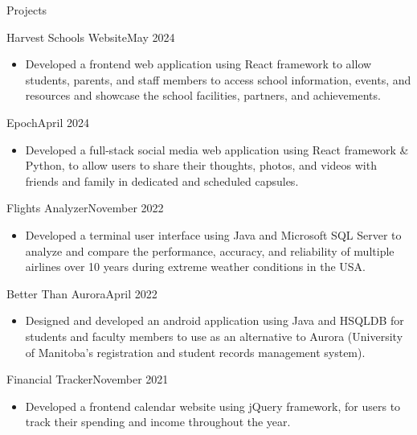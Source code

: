 \documentclass{article}
\newlength{\tabin}
\newlength{\secsep}
\newcommand{\lineunder}{\vspace*{-8pt} \\ \hspace*{-6pt} \hrulefill \\ \vspace*{-15pt}}
\newenvironment{tabbedsection}[1]{
    \begin{list}{}{
        \setlength{\itemsep}{0pt}
        \setlength{\labelsep}{0pt}
        \setlength{\labelwidth}{0pt}
        \setlength{\leftmargin}{\tabin}
        \setlength{\rightmargin}{\tabin}
        \setlength{\listparindent}{0pt}
        \setlength{\parsep}{0pt}
        \setlength{\parskip}{0pt}
        \setlength{\partopsep}{0pt}
        \setlength{\topsep}{#1}
    }
        \item[]
        }{
    \end{list}}
\newenvironment{resume_section}[1]{
    \filbreak
    \vspace{2\secsep}
    \textsc{\large#1}
    \lineunder
    \begin{tabbedsection}{\secsep}
    }{\end{tabbedsection}}
\newenvironment{resume_subsection}[2]{
    \begin{minipage}[t]{0.75\linewidth}
        \textbf{#1}
    \end{minipage}%
    \begin{minipage}[t]{0.25\linewidth}
        \hfill \footnotesize #2
    \end{minipage}
    \begin{tabbedsection}{0.5\secsep}
    }{\end{tabbedsection}}
\newenvironment{subitems}{
    \renewcommand{\labelitemi}{-}
    \begin{itemize}
        \setlength{\labelsep}{1em}
        }{
    \end{itemize}}
\begin{document}
    \begin{resume_section}{Projects}
        \begin{resume_subsection}{Harvest Schools Website}{May 2024}
            \begin{subitems}
                \item Developed a frontend web application using React framework to allow students, parents, and
                staff members to access school information, events, and resources and showcase the school
                facilities, partners, and achievements.
            \end{subitems}
        \end{resume_subsection}

        \begin{resume_subsection}{Epoch}{April 2024}
            \begin{subitems}
                \item Developed a full-stack social media web application using React framework \& Python, to allow
                users to share their thoughts, photos, and videos with friends and family in dedicated and
                scheduled capsules.
            \end{subitems}
        \end{resume_subsection}

        \begin{resume_subsection}{Flights Analyzer}{November 2022}
            \begin{subitems}
                \item Developed a terminal user interface using Java and Microsoft SQL Server to analyze and compare the performance, accuracy, and reliability of multiple airlines over 10 years during extreme weather conditions in the USA.
            \end{subitems}
        \end{resume_subsection}
        \begin{resume_subsection}{Better Than Aurora}{April 2022}
            \begin{subitems}
                \item Designed and developed an android application using Java and HSQLDB for students and faculty
                members to use as an alternative to Aurora (University of Manitoba's registration and student records
                management system).
            \end{subitems}
        \end{resume_subsection}
        \begin{resume_subsection}{Financial Tracker}{November 2021}
            \begin{subitems}
                \item Developed a frontend calendar website using jQuery framework, for users to track their spending
                and income
                throughout the year.
            \end{subitems}
        \end{resume_subsection}
    \end{resume_section}
\end{document}
